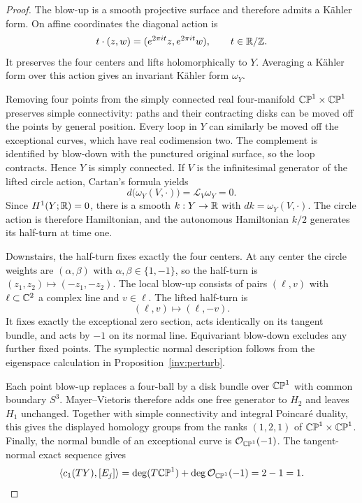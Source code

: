 \begin{proof}
The blow-up is a smooth projective surface and therefore admits a
K\"ahler form. On affine coordinates the diagonal action is
\[
  t\cdot(z,w)=(e^{2\pi it}z,e^{2\pi it}w),
  \qquad t\in\mathbb R/\mathbb Z.
\]
It preserves the four centers and lifts holomorphically to $Y$.
Averaging a K\"ahler form over this action gives an invariant
K\"ahler form $\omega_Y$.

Removing four points from the simply connected real four-manifold
$\mathbb {CP}^1\times\mathbb {CP}^1$ preserves simple connectivity: paths and their
contracting disks can be moved off the points by general position.
Every loop in $Y$ can similarly be moved off the exceptional curves,
which have real codimension two. The complement is identified by
blow-down with the punctured original surface, so the loop contracts.
Hence $Y$ is simply connected. If $V$ is the infinitesimal generator
of the lifted circle action, Cartan's formula yields
\[
  d\bigl(\omega_Y(V,\cdot)\bigr)
  =\mathcal L_V\omega_Y=0.
\]
Since $H^1(Y;\mathbb R)=0$, there is a smooth $k:Y\to\mathbb R$ with
$dk=\omega_Y(V,\cdot)$. The circle action is therefore Hamiltonian,
and the autonomous Hamiltonian $k/2$ generates its half-turn at time one.

Downstairs, the half-turn fixes exactly the four centers. At any center
the circle weights are $(\alpha,\beta)$ with
$\alpha,\beta\in\{1,-1\}$, so the half-turn is
$(z_1,z_2)\mapsto(-z_1,-z_2)$. The local blow-up consists of pairs
$(\ell,v)$ with $\ell\subset\mathbb C^2$ a complex line and $v\in\ell$.
The lifted half-turn is
\[
  (\ell,v)\longmapsto(\ell,-v).
\]
It fixes exactly the exceptional zero section, acts identically on
its tangent bundle, and acts by $-1$ on its normal line. Equivariant
blow-down excludes any further fixed points. The symplectic normal
description follows from the eigenspace calculation in
Proposition~\ref{inv:perturb}.

Each point blow-up replaces a four-ball by a disk bundle over $\mathbb {CP}^1$
with common boundary $S^3$. Mayer--Vietoris therefore adds one free
generator to $H_2$ and leaves $H_1$ unchanged. Together with simple
connectivity and integral Poincar\'e duality, this gives the displayed
homology groups from the ranks $(1,2,1)$ of
$\mathbb {CP}^1\times\mathbb {CP}^1$. Finally, the normal bundle of an exceptional
curve is $\mathcal O_{\mathbb {CP}^1}(-1)$. The tangent-normal exact sequence
gives
\[
  \langle c_1(TY),[E_j]\rangle
  =\deg(T\mathbb {CP}^1)+\deg\mathcal O_{\mathbb {CP}^1}(-1)=2-1=1.
\]
\end{proof}

